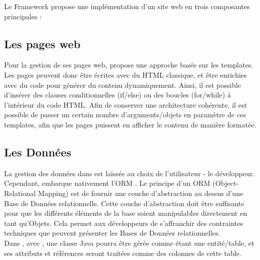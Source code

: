Le Framework \kwplay{} propose une implémentation d'un site web en trois composantes principales :


\subsection{Les pages web}
Pour la gestion de ses pages web, \kwplay{} propose une approche basée sur les templates. Les pages peuvent donc être écrites avec du HTML classique, et être enrichies avec du code \kwscala{} pour générer du contenu dynamiquement. Ainsi, il est possible d'insérer des clauses conditionnelles (if/else) ou des boucles (for/while) à l'intérieur du code HTML. Afin de conserver une architecture cohérente, il est possible de passer un certain nombre d'arguments/objets en paramètre de ces templates, afin que les pages puissent en afficher le contenu de manière formatée.

\subsection{Les Données}
La gestion des données dans \kwplay{} est laissée au choix de l'utilisateur - le développeur. Cependant, \kwplay{} embarque nativement l'ORM \kwebean{}. Le principe d'un ORM (Object-Relational Mapping) est de fournir une couche d'abstraction au dessus d'une Base de Données relationnelle. Cette couche d'abstraction doit être suffisante pour que les différents éléments de la base soient manipulables directement en tant qu'Objets. Cela permet aux développeurs de s'affranchir des contraintes techniques que peuvent présenter les Bases de Données relationnelles.\\
Dans \kwplay{}, avec \kwebean{}, une classe Java pourra être gérée comme étant une entité/table, et ses attributs et références seront traitées comme des colonnes de cette table.

